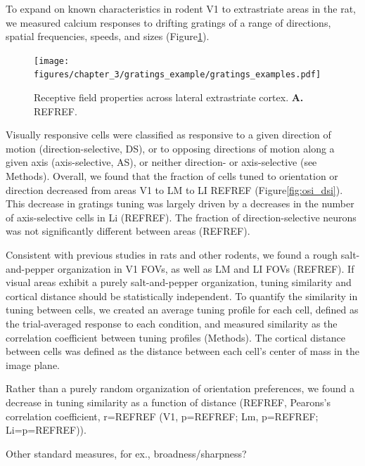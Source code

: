 To expand on known characteristics in rodent V1 to extrastriate areas in the rat, we measured calcium responses to drifting gratings of a range of directions, spatial frequencies, speeds, and sizes (Figure\ref{fig:gratings_examples}). 

\begin{figure}[t!]
    \texttt{[image: figures/chapter\_3/gratings\_example/gratings\_examples.pdf]}
    \vspace{.1in}
    \caption[Compensatory visual field coverage]{Receptive field properties across lateral extrastriate cortex. \textbf{A.} REFREF.
    \label{fig:gratings_examples}}
\end{figure}

Visually responsive cells were classified as responsive to a given direction of motion (direction-selective, DS), or to opposing directions of motion along a given axis (axis-selective, AS), or neither direction- or axis-selective (see Methods). Overall, we found that the fraction of cells tuned to orientation or direction decreased from areas V1 to LM to LI REFREF (Figure\ref{fig:osi_dsi}). This decrease in gratings tuning was largely driven by a decreases in the number of axis-selective cells in Li (REFREF). The fraction of direction-selective neurons was not significantly different between areas (REFREF).   

Consistent with previous studies in rats and other rodents, we found a rough salt-and-pepper organization in V1 FOVs, as well as LM and LI FOVs (REFREF). 
If visual areas exhibit a purely salt-and-pepper organization, tuning similarity and cortical distance should be statistically independent. To quantify the similarity in tuning between cells, we created an average tuning profile for each cell, defined as the trial-averaged response to each condition, and measured similarity as the correlation coefficient between tuning profiles (Methods). The cortical distance between cells was defined as the distance between each cell’s center of mass in the image plane. 

Rather than a purely random organization of orientation preferences, we found a decrease in tuning similarity as a function of distance (REFREF, Pearons’s correlation coefficient, r=REFREF (V1, p=REFREF; Lm, p=REFREF; Li=p=REFREF)). 


Other standard measures, for ex., broadness/sharpness?







